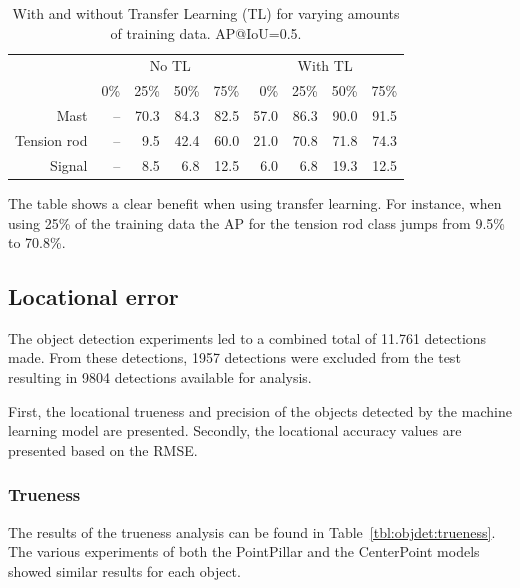 \begin{table}[ht]
    \centering
    \begin{tabular}{rrrrrrrrr}
        \toprule
         & \multicolumn{4}{c}{No TL} & \multicolumn{4}{c}{With TL}\\
         \cmidrule(lr){2-5} \cmidrule(lr){6-9}
         & 0\% & 25\% & 50\% & 75\% & 0\% & 25\% & 50\% & 75\%\\
        \midrule
        Mast &        -- & 70.3 & 84.3 & 82.5 & 57.0 & 86.3 & 90.0 & 91.5\\
        Tension rod & -- &  9.5 & 42.4 & 60.0 & 21.0 & 70.8 & 71.8 & 74.3\\
        Signal &      -- &  8.5 &  6.8 & 12.5 &  6.0 &  6.8 & 19.3 & 12.5\\
        \bottomrule
    \end{tabular}
    \caption{With and without Transfer Learning (TL) for varying amounts of training data. AP@IoU=0.5.}
    \label{tbl:objdet:transfer}
\end{table}

The table shows a clear benefit when using transfer learning. For instance, when using 25\% of the training data the AP for the tension rod class jumps from 9.5\% to 70.8\%.

\subsection{Locational error}
The object detection experiments led to a combined total of 11.761 detections made. From these detections, 1957 detections were excluded from the test resulting in 9804 detections available for analysis. 

First, the locational trueness and precision of the objects detected by the machine learning model are presented. Secondly, the locational accuracy values are presented based on the RMSE.

\subsubsection{Trueness}
The results of the trueness analysis can be found in Table~\ref{tbl:objdet:trueness}. The various experiments of both the PointPillar and the CenterPoint models showed similar results for each object.

